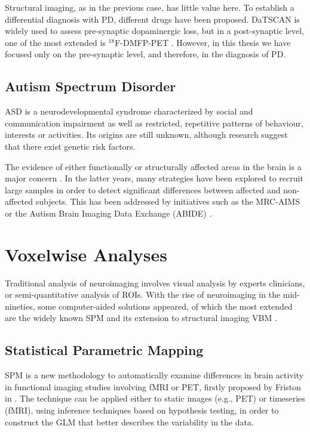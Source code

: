 Structural imaging, as in the previous case, has little value here. To establish a differential diagnosis with \ac{PD}, different drugs have been proposed. DaTSCAN is widely used to assess pre-synaptic dopaminergic loss, but in a post-synaptic level, one of the most extended is $^{18}$F-DMFP-PET \cite{Segovia2016a}. However, in this thesis we have focused only on the pre-synaptic level, and therefore, in the diagnosis of \ac{PD}. 

\subsection{Autism Spectrum Disorder}
\acf{ASD} is a neurodevelopmental syndrome characterized by social and communication impairment as well as restricted, repetitive patterns of behaviour, interests or activities. Its origins are still unknown, although research suggest \cite{Szatmari1999} that there exist genetic risk factors. 

The evidence of either functionally or structurally affected areas in the brain is a major concern \cite{Ecker2014,haar2014anatomical}. In the latter years, many strategies have been explored to recruit large samples in order to detect significant differences between affected and non-affected subjects. This has been addressed by initiatives such as the \ac{MRC-AIMS} \cite{Ecker2012,Ecker2013} or the Autism Brain Imaging Data Exchange (ABIDE) \cite{DiMartino2014}. 


\section{Voxelwise Analyses}\label{sec:vwanalyses}
Traditional analysis of neuroimaging involves visual analysis by experts clinicians, or semi-quantitative analysis of \acp{ROI}. With the rise of neuroimaging in the mid-nineties, some computer-aided solutions appeared, of which the most extended are the widely known \acf{SPM} \cite{Friston1994} and its extension to structural imaging \acf{VBM} \cite{Ashburner2000}. 

\subsection{Statistical Parametric Mapping}
\acf{SPM} is a new methodology to automatically examine differences in brain activity in functional imaging studies involving \ac{fMRI} or \ac{PET}, firstly proposed by Friston in \cite{Friston1994}. The technique can be applied either to static images (e.g., \ac{PET}) or timeseries (\ac{fMRI}), using inference techniques based on hypothesis testing, in order to construct the \ac{GLM} that better describes the variability in the data. 

